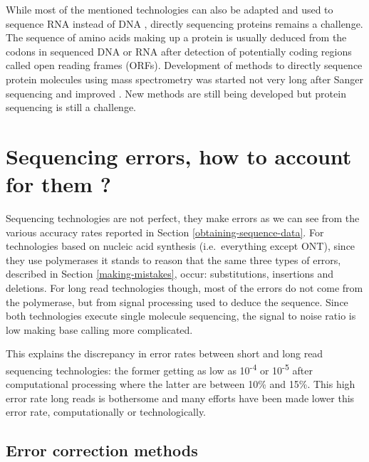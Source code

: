 \documentclass[
  11pt,
  twoside]{scrbook}
\begin{document}
While most of the mentioned technologies can also be adapted and used to sequence RNA instead of DNA \autocite{hongRNASequencingNew2020,ozsolakRNASequencingAdvances2011}, directly sequencing proteins remains a challenge. The sequence of amino acids making up a protein is usually deduced from the codons in sequenced DNA or RNA after detection of potentially coding regions called open reading frames (ORFs). Development of methods to directly sequence protein molecules using mass spectrometry was started not very long after Sanger sequencing \autocite{huntProteinSequencingTandem1986} and improved \autocite{smithProteinSequencingProtocols2002}. New methods are still being developed \autocite{restrepo-perezPavingWaySinglemolecule2018} but protein sequencing is still a challenge.

\hypertarget{sequencing-errors-how-to-account-for-them}{%
\section{Sequencing errors, how to account for them ?}\label{sequencing-errors-how-to-account-for-them}}

Sequencing technologies are not perfect, they make errors as we can see from the various accuracy rates reported in Section \ref{obtaining-sequence-data}. For technologies based on nucleic acid synthesis (i.e.~everything except ONT), since they use polymerases it stands to reason that the same three types of errors, described in Section \ref{making-mistakes}, occur: substitutions, insertions and deletions. For long read technologies though, most of the errors do not come from the polymerase, but from signal processing used to deduce the sequence. Since both technologies execute single molecule sequencing, the signal to noise ratio is low \autocite{weirather2017,wangNanoporeSequencingTechnology2021} making base calling more complicated.

This explains the discrepancy in error rates between short and long read sequencing technologies: the former getting as low as 10\textsuperscript{-4} or 10\textsuperscript{-5} after computational processing \autocite{maAnalysisErrorProfiles2019} where the latter are between 10\% and 15\%. This high error rate long reads is bothersome and many efforts have been made lower this error rate, computationally or technologically.

\hypertarget{error-correction-methods}{%
\subsection{Error correction methods}\label{error-correction-methods}}
\end{document}
